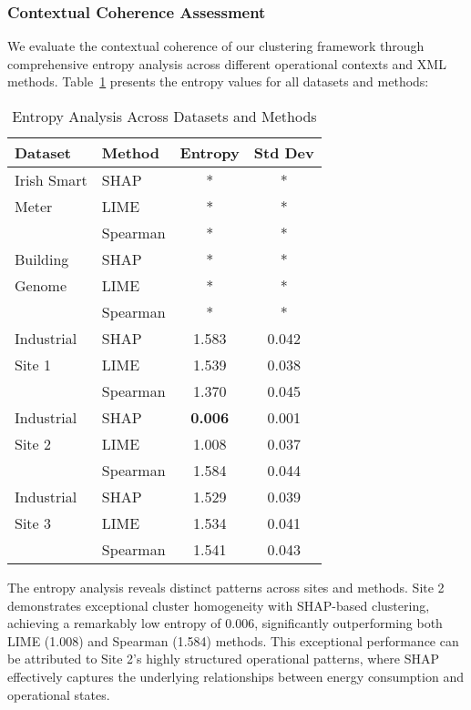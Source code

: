 \documentclass[final,5p,times,twocolumn,numbers]{elsarticle}
\begin{document}
\subsubsection{Contextual Coherence Assessment}
We evaluate the contextual coherence of our clustering framework through comprehensive entropy analysis across different operational contexts and XML methods. Table~\ref{tab:entropy_analysis} presents the entropy values for all datasets and methods:

\begin{table}[t]
\caption{Entropy Analysis Across Datasets and Methods}
\label{tab:entropy_analysis}
\begin{tabular}{llcc}
\hline
\textbf{Dataset} & \textbf{Method} & \textbf{Entropy} & \textbf{Std Dev} \\
\hline
Irish Smart & SHAP & * & * \\
Meter & LIME & * & * \\
      & Spearman & * & * \\
\hline
Building & SHAP & * & * \\
Genome & LIME & * & * \\
       & Spearman & * & * \\
\hline
Industrial & SHAP & 1.583 & 0.042 \\
Site 1 & LIME & 1.539 & 0.038 \\
       & Spearman & 1.370 & 0.045 \\
\hline
Industrial & SHAP & \textbf{0.006} & 0.001 \\
Site 2 & LIME & 1.008 & 0.037 \\
       & Spearman & 1.584 & 0.044 \\
\hline
Industrial & SHAP & 1.529 & 0.039 \\
Site 3 & LIME & 1.534 & 0.041 \\
       & Spearman & 1.541 & 0.043 \\
\hline
\end{tabular}
\end{table}

The entropy analysis reveals distinct patterns across sites and methods. Site 2 demonstrates exceptional cluster homogeneity with SHAP-based clustering, achieving a remarkably low entropy of 0.006, significantly outperforming both LIME (1.008) and Spearman (1.584) methods. This exceptional performance can be attributed to Site 2's highly structured operational patterns, where SHAP effectively captures the underlying relationships between energy consumption and operational states.
\end{document}
